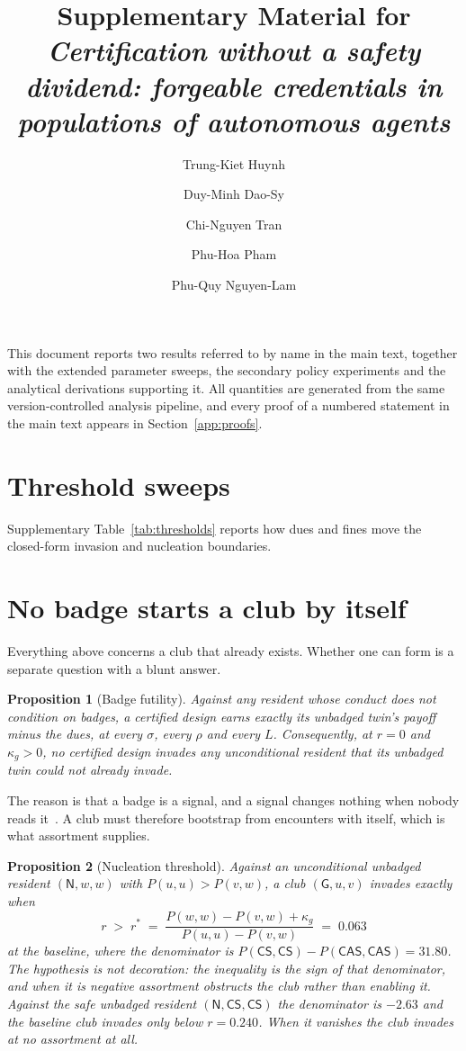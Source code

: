 \documentclass[11pt,a4paper]{article}
\title{Supplementary Material for\\
\emph{Certification without a safety dividend: forgeable credentials in
populations of autonomous agents}}
\author{Trung-Kiet Huynh \and Duy-Minh Dao-Sy \and Chi-Nguyen Tran \and
Phu-Hoa Pham \and Phu-Quy Nguyen-Lam}
\date{}
\newtheorem{proposition}{Proposition}
\newcommand{\CS}{\textsf{CS}}
\newcommand{\CAS}{\textsf{CAS}}
\begin{document}
\maketitle

This document reports two results referred to by name in the main text,
together with the extended parameter sweeps, the secondary policy experiments
and the analytical derivations supporting it. All quantities are generated from
the same version-controlled analysis pipeline, and every proof of a numbered
statement in the main text appears in Section~\ref{app:proofs}.

\section{Threshold sweeps}
Supplementary Table~\ref{tab:thresholds} reports how dues and fines move the closed-form invasion and nucleation boundaries.



\section{No badge starts a club by itself}
\label{sec:nucleation}

Everything above concerns a club that already exists. Whether one can form is a
separate question with a blunt answer.

\begin{proposition}[Badge futility]
\label{prop:futility}
Against any resident whose conduct does not condition on badges, a certified
design earns exactly its unbadged twin's payoff minus the dues, at every
$\sigma$, every $\rho$ and every $L$. Consequently, at $r = 0$ and
$\kappa_g > 0$, no certified design invades any unconditional resident that its
unbadged twin could not already invade.
\end{proposition}

The reason is that a badge is a signal, and a signal changes nothing when
nobody reads it~\citep{katz1985network}. A club must therefore bootstrap from encounters with itself,
which is what assortment supplies.

\begin{proposition}[Nucleation threshold]
\label{prop:nucleation}
Against an unconditional unbadged resident $(\mathsf{N}, w, w)$ with
$P(u,u) > P(v,w)$, a club $(\mathsf{G}, u, v)$ invades exactly when
\begin{equation}
\label{eq:rstar}
r \;>\; r^{*} \;=\; \frac{P(w,w) - P(v,w) + \kappa_g}{P(u,u) - P(v,w)}
  \;=\; 0.063
\end{equation}
at the baseline, where the denominator is
$P(\CS,\CS) - P(\CAS,\CAS) = 31.80$. The hypothesis is not decoration: the
inequality is the sign of that denominator, and when it is negative assortment
obstructs the club rather than enabling it. Against the \emph{safe} unbadged
resident $(\mathsf{N}, \CS, \CS)$ the denominator is $-2.63$ and the baseline
club invades only \emph{below} $r = 0.240$. When it vanishes the club invades
at no assortment at all.
\end{proposition}
\end{document}
